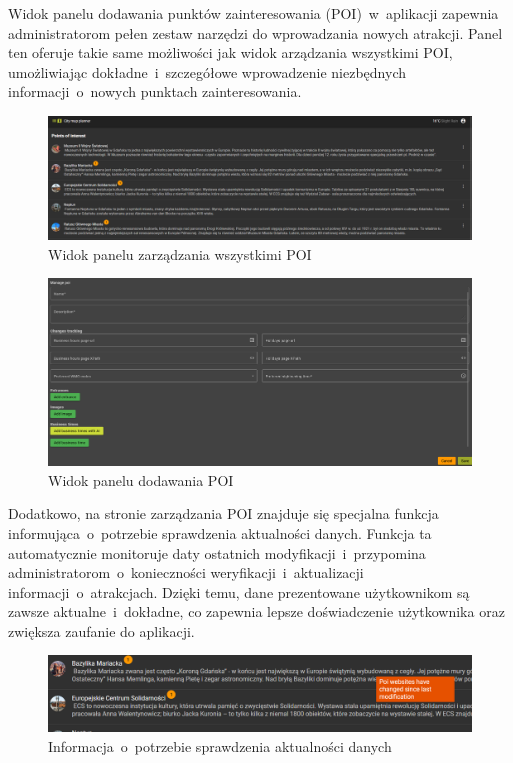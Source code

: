 Widok panelu dodawania punktów zainteresowania (POI)~w~aplikacji zapewnia administratorom pełen zestaw narzędzi do wprowadzania nowych atrakcji.
Panel ten oferuje takie same możliwości jak widok arządzania wszystkimi POI, umożliwiając dokładne~i~szczegółowe wprowadzenie
niezbędnych informacji~o~nowych punktach zainteresowania.


    \begin{figure}[H]
    \centering
    \includegraphics[width=1\textwidth]{attachments/poi-manage}
    \caption{Widok panelu zarządzania wszystkimi POI}
    \label{fig:poi-manage}
\end{figure}
\begin{figure}[H]
    \centering
    \includegraphics[width=1\textwidth]{attachments/addpoi}
    \caption{Widok panelu dodawania POI}
    \label{fig:ManageNofify}
\end{figure}

Dodatkowo, na stronie zarządzania POI znajduje się specjalna funkcja informująca~o~potrzebie sprawdzenia aktualności danych.
Funkcja ta automatycznie monitoruje daty ostatnich modyfikacji~i~przypomina administratorom~o~konieczności weryfikacji~i~aktualizacji informacji~o~atrakcjach.
Dzięki temu, dane prezentowane użytkownikom są zawsze aktualne~i~dokładne, co zapewnia lepsze doświadczenie użytkownika oraz zwiększa zaufanie do aplikacji.
\begin{figure}[H]
    \centering
    \includegraphics[width=1\textwidth]{attachments/poi-notify}
    \caption{Informacja~o~potrzebie sprawdzenia aktualności danych}
    \label{fig:ManageNofify}
\end{figure}
